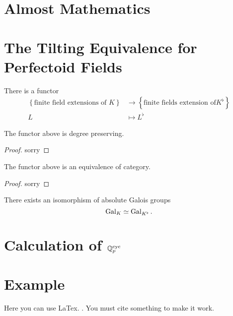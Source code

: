 \section{Almost Mathematics}

\section{The Tilting Equivalence for Perfectoid Fields}

\begin{definition}
    \label{Tilting Functor (Finite Extension)}
    \notready

    There is a functor 
    \begin{align*}
        \left \{ \text{finite field extensions of } K \right \} & \to \left \{ \text{finite fields extension of} K^\flat \right \} \\
        L & \mapsto L^\flat
    \end{align*}

\end{definition}

\begin{theorem}
    \label{tilting_finite_degree_preserving}
    \notready

    The functor above is degree preserving.
\end{theorem}

\begin{proof}
    \notready

    sorry
\end{proof}

\begin{theorem}
    \label{tilting_finite_equivalence_of_category}
    \notready

    The functor above is an equivalence of category.
\end{theorem}

\begin{proof}
    \notready

    sorry
\end{proof}

\begin{definition}
    \label{Galois Isomorphism of Perfectoid Fields}

    \notready

    There exists an isomorphism of absolute Galois groups
    $$ \operatorname{Gal}_K \simeq \operatorname{Gal}_{K^\flat}.$$
\end{definition}

\section{Calculation of $\mathbb{Q}_p^{{\text{cyc}}}$}


\section{Example}
Here you can use LaTex. \cite{marcus}. You must cite something to make it work.



